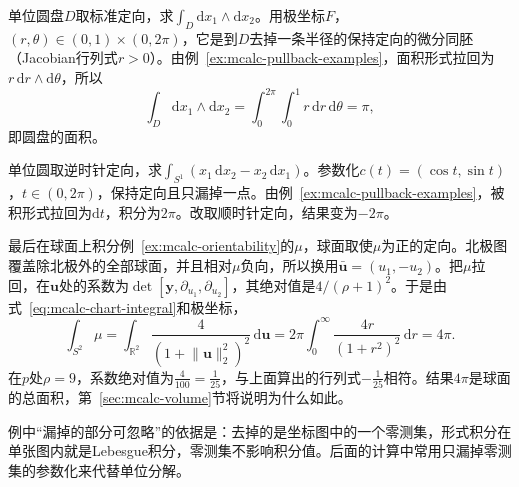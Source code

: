 \begin{example}[两个积分与球面的总面积]
\label{ex:mcalc-form-integral-examples}
单位圆盘$D$取标准定向，求$\int_D\mathrm dx_1\wedge\mathrm dx_2$。用极坐标$F$，$(r,\theta)\in(0,1)\times(0,2\pi)$，它是到$D$去掉一条半径的保持定向的微分同胚（Jacobian行列式$r>0$）。由例~\ref{ex:mcalc-pullback-examples}，面积形式拉回为$r\,\mathrm dr\wedge\mathrm d\theta$，所以
\[
\int_D\mathrm dx_1\wedge\mathrm dx_2=\int_0^{2\pi}\!\!\int_0^1r\,\mathrm dr\,\mathrm d\theta=\pi ,
\]
即圆盘的面积。

单位圆取逆时针定向，求$\int_{S^1}(x_1\,\mathrm dx_2-x_2\,\mathrm dx_1)$。参数化$c(t)=(\cos t,\sin t)$，$t\in(0,2\pi)$，保持定向且只漏掉一点。由例~\ref{ex:mcalc-pullback-examples}，被积形式拉回为$\mathrm dt$，积分为$2\pi$。改取顺时针定向，结果变为$-2\pi$。

最后在球面上积分例~\ref{ex:mcalc-orientability}的$\mu$，球面取使$\mu$为正的定向。北极图覆盖除北极外的全部球面，并且相对$\mu$负向，所以换用$\bar{\bm u}=(u_1,-u_2)$。把$\mu$拉回，在$\bm u$处的系数为$\det[\bm y,\partial_{u_1},\partial_{u_2}]$，其绝对值是$4/(\rho+1)^2$。于是由式~\eqref{eq:mcalc-chart-integral}和极坐标，
\[
\int_{S^2}\mu=\int_{\mathbb R^2}\frac{4}{(1+\lVert\bm u\rVert_2^2)^2}\,\mathrm d\bm u=2\pi\int_0^\infty\frac{4r}{(1+r^2)^2}\,\mathrm dr=4\pi .
\]
在$p$处$\rho=9$，系数绝对值为$\tfrac4{100}=\tfrac1{25}$，与上面算出的行列式$-\tfrac1{25}$相符。结果$4\pi$是球面的总面积，第~\ref{sec:mcalc-volume}节将说明为什么如此。
\end{example}

例中“漏掉的部分可忽略”的依据是：去掉的是坐标图中的一个零测集，形式积分在单张图内就是Lebesgue积分，零测集不影响积分值。后面的计算中常用只漏掉零测集的参数化来代替单位分解。
